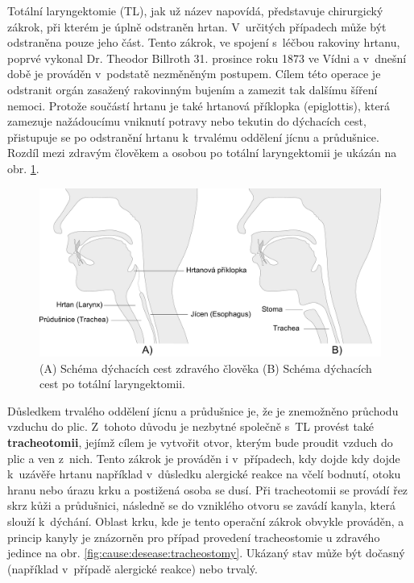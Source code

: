 Totální laryngektomie (TL), jak už název napovídá, představuje chirurgický
zákrok, při kterém je úplně odstraněn hrtan. V~určitých případech může být
odstraněna pouze jeho část. Tento zákrok, ve spojení s~léčbou
rakoviny hrtanu, poprvé vykonal Dr. Theodor Billroth 31. prosince roku 1873 ve
Vídni \cite{Gussenbauer1874} a v~dnešní době je prováděn v~podstatě nezměněným postupem.
Cílem této operace je odstranit orgán zasažený rakovinným bujením a
zamezit tak dalšímu šíření nemoci. Protože součástí hrtanu je také hrtanová příklopka
(epiglottis), která zamezuje nažádoucímu vniknutí potravy nebo tekutin do
dýchacích cest, přistupuje se po odstranění hrtanu k~trvalému oddělení jícnu a průdušnice.
Rozdíl mezi zdravým člověkem a osobou po totální laryngektomii je ukázán na
obr. \ref{fig:cause:desease:laryngectomy}.

\begin{figure}[htb]
  \begin{center}
    \def\svgwidth{0.9\linewidth}
    \includegraphics[width=0.9\linewidth]{ch3-cause/figures/dychaci-cesty-tl}
    \caption[Schéma dýchacích cest zdravého člověka a pacienta po TL.]{(A) Schéma dýchacích cest zdravého člověka (B) Schéma dýchacích cest po totální laryngektomii.}
    \label{fig:cause:desease:laryngectomy}
  \end{center}
\end{figure}

Důsledkem trvalého oddělení jícnu a průdušnice je, že je znemožněno průchodu vzduchu do plic.
Z~tohoto důvodu je nezbytné společně s~TL provést také \textbf{tracheotomii}, jejímž cílem je vytvořit otvor, kterým
bude proudit vzduch do plic a ven z~nich. Tento zákrok je prováděn i v~případech, kdy dojde kdy dojde  k~uzávěře hrtanu například v~důsledku alergické reakce na včelí bodnutí, otoku hranu nebo úrazu krku a postižená osoba se dusí. Při tracheotomii se provádí řez skrz kůži a průdušnici, následně se do vzniklého
otvoru se zavádí kanyla, která slouží  k~dýchání. Oblast krku, kde je tento operační zákrok obvykle prováděn, a
princip kanyly je znázorněn pro případ provedení tracheostomie u zdravého jedince na obr. \ref{fig:cause:desease:tracheostomy}. Ukázaný stav může být dočasný (například v~případě alergické
reakce) nebo trvalý.

